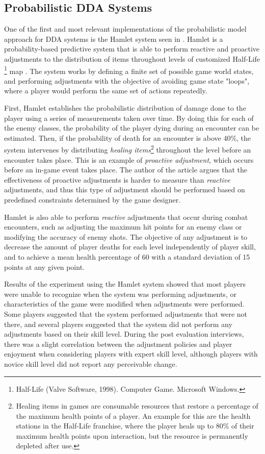\documentclass[cic,tc,english]{iiufrgs}
\begin{document}
\subsection{Probabilistic DDA Systems}

One of the first and most relevant implementations of the probabilistic model approach for DDA systems is the Hamlet system seen in \cite{article_casefordynamicdifficulty}. Hamlet is a probability-based predictive system that is able to perform reactive and proactive adjustments to the distribution of items throughout levels of customized Half-Life \footnote{Half-Life (Valve Software, 1998). Computer Game. Microsoft Windows.} map \cite{article_casefordynamicdifficulty}. The system works by defining a finite set of possible game world states, and performing adjustments with the objective of avoiding game state "loops", where a player would perform the same set of actions repeatedly.

First, Hamlet establishes the probabilistic distribution of damage done to the player using a series of measurements taken over time. By doing this for each of the enemy classes, the probability of the player dying during an encounter can be estimated. Then, if the probability of death for an encounter is above 40\%, the system intervenes by distributing \emph{healing items}\footnote{Healing items in games are consumable resources that restore a percentage of the maximum health points of a player. An example for this are the health stations in the Half-Life franchise, where the player heals up to 80\% of their maximum health points upon interaction, but the resource is permanently depleted after use.} throughout the level before an encounter takes place. This is an example of \emph{proactive adjustment}, which occurs before an in-game event takes place. The author of the article argues that the effectiveness of proactive adjustments is harder to measure than \emph{reactive} adjustments, and thus this type of adjustment should be performed based on predefined constraints determined by the game designer.

Hamlet is also able to perform \emph{reactive} adjustments that occur during combat encounters, such as adjusting the maximum hit points for an enemy class or modifying the accuracy of enemy shots. The objective of any adjustment is to decrease the amount of player deaths for each level independently of player skill, and to achieve a mean health percentage of 60 with a standard deviation of 15 points at any given point.

Results of the experiment using the Hamlet system showed that most players were unable to recognize when the system was performing adjustments, or characteristics of the game were modified when adjustments were performed. Some players suggested that the system performed adjustments that were not there, and several players suggested that the system did not perform any adjustments based on their skill level. During the post evaluation interviews, there was a slight correlation between the adjustment policies and player enjoyment when considering players with expert skill level, although players with novice skill level did not report any perceivable change.
\end{document}
